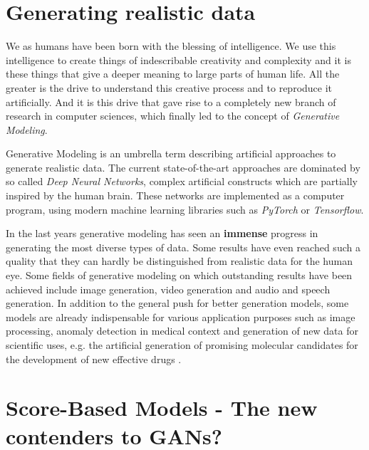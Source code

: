 
\section{Generating realistic data} %

We as humans have been born with the blessing of intelligence. We use this intelligence to create things of indescribable creativity and complexity and it is these things that give a deeper meaning to large parts of human life. All the greater is the drive to understand this creative process and to reproduce it artificially. And it is this drive that gave rise to a completely new branch of research in computer sciences, which finally led to the concept of \textit{Generative Modeling}.

Generative Modeling is an umbrella term describing artificial approaches to generate realistic data. The current state-of-the-art approaches are dominated by so called \textit{Deep Neural Networks}, complex artificial constructs which are partially inspired by the human brain. These networks are implemented as a computer program, using modern machine learning libraries such as \textit{PyTorch} or \textit{Tensorflow}.

In the last years generative modeling has seen an \textbf{immense} progress in generating the most diverse types of data. Some results have even reached such a quality that they can hardly be distinguished from realistic data for the human eye. Some fields of generative modeling on which outstanding results have been achieved include image generation, video generation and audio and speech generation. In addition to the general push for better generation models, some models are already indispensable for various application purposes such as image processing, anomaly detection in medical context and generation of new data for scientific uses, e.g. the artificial generation of promising molecular candidates for the development of new effective drugs \cite{molgrad}.

\section{Score-Based Models - The new contenders to GANs?} %

